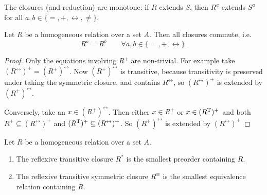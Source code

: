 \begin{lemma}
The closures (and reduction) are monotone: if $R$ extends $S$, then $R^a$ extends $S^a$ for all $a,b\in\{=,+,\leftrightarrow,\neq\}$.
\end{lemma}

\begin{lemma}
Let $R$ be a homogeneous relation over a set $A$. Then all closures commute, i.e.
\[ R^a = R^b \qquad \forall a,b\in\{=,+,\leftrightarrow\}. \]
\end{lemma}
\begin{proof}
Only the equations involving $R^+$ are non-trivial. For example take $(R^\leftrightarrow)^+ = (R^+)^\leftrightarrow$. Now $(R^+)^\leftrightarrow$ is transitive, because transitivity is preserved under taking the symmetric closure, and contains $R^\leftrightarrow$, so $(R^\leftrightarrow)^+$ is extended by $(R^+)^\leftrightarrow$.

Conversely, take an $x\in (R^+)^\leftrightarrow$. Then either $x\in R^+$ or $x\in (R^{\mathrm{T}})^+$ and both $R^+\subseteq (R^\leftrightarrow)^+$ and $(R^{\mathrm{T}})^+\subseteq (R^\leftrightarrow)^+$. So $(R^+)^\leftrightarrow$ is extended by $(R^\leftrightarrow)^+$
\end{proof}

\begin{lemma}
Let $R$ be a homogeneous relation over a set $A$.
\begin{enumerate}
\item The reflexive transitive closure $R^*$ is the smallest preorder containing $R$.
\item The reflexive transitive symmetric closure $R^\equiv$ is the smallest equivalence relation containing $R$.
\end{enumerate}
\end{lemma}

